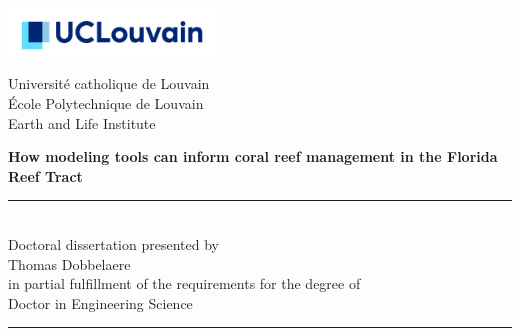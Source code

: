 \thispagestyle{empty}
\begin{minipage}[b]{0.3\textwidth}
\hspace*{-0.8cm}\includegraphics[width=5.5cm]{./figures/logo_ucl.jpg}\vspace{0.85cm}
\end{minipage}
\begin{minipage}[b]{0.69\textwidth}

\begin{center}
\hspace*{0.5cm}Université catholique de Louvain\\
\hspace*{0.5cm}\'Ecole Polytechnique de Louvain\\
\hspace*{0.5cm} Earth and Life Institute\\
\end{center}
\end{minipage}


\vspace*{1.2cm}
\hspace{-0.8cm}
\begin{minipage}{1.02\linewidth}
\centering
\LARGE\bfseries How modeling tools can inform coral reef management in the Florida Reef Tract
\end{minipage}


\vspace*{0.5cm}
\hspace{-0.5cm}\begin{minipage}{\textwidth}
\centering
\rule{50pt}{.5pt}\\[1.2ex]
Doctoral dissertation presented by \\ [2.ex]
{\Large Thomas Dobbelaere\\ [2.ex]
}
in partial fulfillment of the requirements for the degree of\\ [2.ex]
\Large Doctor in Engineering Science

\rule{50pt}{.5pt}\\
\end{minipage}

